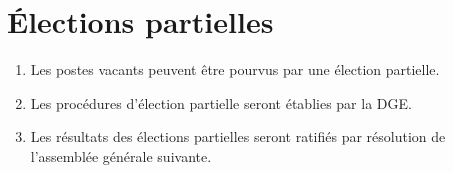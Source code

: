 \section{Élections partielles}
\label{elections-partielles}

\begin{enumerate}
 \item Les postes vacants peuvent être pourvus par une élection partielle.
 \item Les procédures d'élection partielle seront établies par la DGE.
 \item Les résultats des élections partielles seront ratifiés par résolution de l'assemblée générale suivante.
\end{enumerate}

